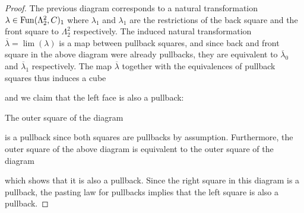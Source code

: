 \begin{lemma}
\begin{proof}
        The previous diagram corresponds to a natural transformation $\lambda\in\operatorname{Fun}(\Lambda_2^2,C)_1$ where $\lambda_1$ and $\lambda_1 $ are the restrictions of the back square and the front square to $\Lambda_2^2$ respectively.
        The induced natural transformation $\overline{\lambda}=\lim(\lambda)$ is a map between pullback squares, and since back and front square in the above diagram were already pullbacks, they are equivalent to $\overline{\lambda}_0$ and $\overline{\lambda}_1$ respectively.
        The map $\overline{\lambda}$ together with the equivalences of pullback squares thus induces a cube
        \begin{center}
        \end{center}
        and we claim that the left face is also a pullback:

        The outer square of the diagram
        \begin{center}
        \end{center}
        is a pullback since both squares are pullbacks by assumption.
        Furthermore, the outer square of the above diagram is equivalent to the outer square of the diagram
        \begin{center}
        \end{center}
        which shows that it is also a pullback.
        Since the right square in this diagram is a pullback, the pasting law for pullbacks implies that the left square is also a pullback.


\end{proof}
\end{lemma}
